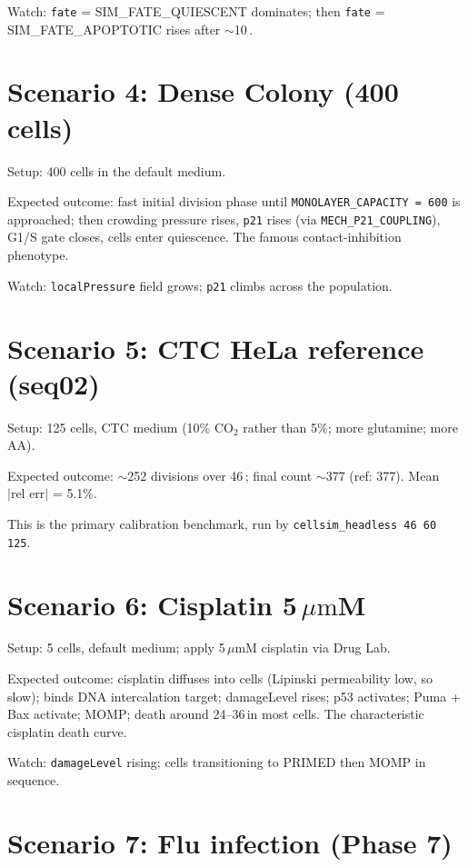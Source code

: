 \documentclass[11pt,letterpaper,twoside,openany]{book}
\newcommand{\code}[1]{\texttt{#1}}
\newcommand{\bioh}{\text{bio-h}}
\newcommand{\um}{\ensuremath{\mu\text{m}}}
\begin{document}
Watch: \code{fate} = SIM\_FATE\_QUIESCENT dominates; then
\code{fate} = SIM\_FATE\_APOPTOTIC rises after $\sim$10\,\bioh.

\section{Scenario 4: Dense Colony (400 cells)}

Setup: 400 cells in the default medium.

Expected outcome: fast initial division phase until
\code{MONOLAYER\_CAPACITY = 600} is approached; then crowding
pressure rises, \code{p21} rises (via \code{MECH\_P21\_COUPLING}),
G1/S gate closes, cells enter quiescence. The famous
contact-inhibition phenotype.

Watch: \code{localPressure} field grows; \code{p21} climbs across
the population.

\section{Scenario 5: CTC HeLa reference (seq02)}

Setup: 125 cells, CTC medium (10\% CO$_2$ rather than 5\%; more
glutamine; more AA).

Expected outcome: $\sim$252 divisions over 46\,\bioh; final count
$\sim$377 (ref: 377). Mean $|\text{rel err}|$ = 5.1\%.

This is the primary calibration benchmark, run by
\code{cellsim\_headless 46 60 125}.

\section{Scenario 6: Cisplatin 5\,\um M}

Setup: 5 cells, default medium; apply 5\,\um M cisplatin via Drug
Lab.

Expected outcome: cisplatin diffuses into cells (Lipinski
permeability low, so slow); binds DNA intercalation target;
damageLevel rises; p53 activates; Puma + Bax activate; MOMP; death
around 24--36\,\bioh in most cells. The characteristic cisplatin
death curve.

Watch: \code{damageLevel} rising; cells transitioning to PRIMED
then MOMP in sequence.

\section{Scenario 7: Flu infection (Phase 7)}
\end{document}
